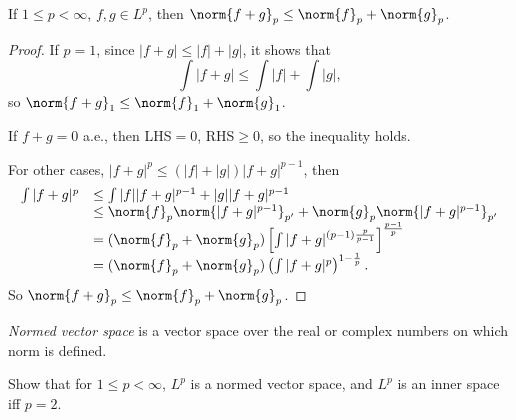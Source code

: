 \begin{thm}
    If $1\le p<\infty$, $f,g\in L^{p}$, then 
    $\norm{f+g}_{p}\le\norm{f}_{p}+\norm{g}_{p}$.
\end{thm}
\begin{proof}
    If $p=1$, since $|f+g|\le|f|+|g|$, it shows that 
    \begin{displaymath}
        \int|f+g|\le\int|f|+\int|g|,
    \end{displaymath}
    so $\norm{f+g}_{1}\le\norm{f}_{1}+\norm{g}_{1}$.

    If $f+g=0$ a.e., then LHS$=0$, RHS$\ge 0$, so the inequality 
    holds. 

    For other cases, $|f+g|^{p}\le(|f|+|g|)|f+g|^{p-1}$, then 
    \begin{displaymath}
        \begin{array}{rl}
            \int|f+g|^{p}&\le \int|f||f+g|^{p-1}+|g||f+g|^{p-1}\\
            &\le\norm{f}_{p}\norm{|f+g|^{p-1}}_{p'}
            +\norm{g}_{p}\norm{|f+g|^{p-1}}_{p'}\\
            &=(\norm{f}_{p}+\norm{g}_{p})
            \left[\int|f+g|^{(p-1)\frac{p}{p-1}}\right]
            ^{\frac{p-1}{p}}\\
            &=(\norm{f}_{p}+\norm{g}_{p})
            \left(\int|f+g|^{p}\right)^{1-\frac{1}{p}}.
        \end{array}
    \end{displaymath}
    So $\norm{f+g}_{p}\le\norm{f}_{p}+\norm{g}_{p}$.
\end{proof}
\begin{defn}
    \label{Defn:NVS}
    \textit{Normed vector space} is a vector space 
    over the real or complex numbers on which norm is defined.
\end{defn}
\begin{exc}
    \label{Exc:LpisNVS}
    Show that for $1\le p<\infty$, $L^{p}$ is a normed vector space, 
    and $L^{p}$ is an inner space iff $p=2$.
\end{exc}
